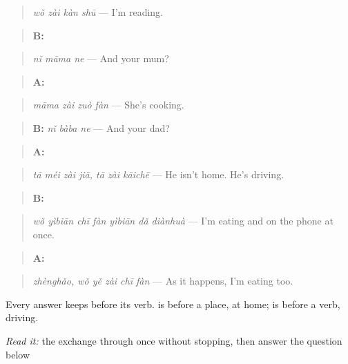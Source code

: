 \begin{quote}
\emph{wǒ zài kàn shū} — I'm reading.
\end{quote}

\begin{quote}
\textbf{B:} 
\end{quote}

\begin{quote}
\emph{nǐ māma ne} — And your mum?
\end{quote}

\begin{quote}
\textbf{A:} 
\end{quote}

\begin{quote}
\emph{māma zài zuò fàn} — She's cooking.
\end{quote}

\begin{quote}
\textbf{B:} \emph{nǐ bàba ne} — And your dad?
\end{quote}

\begin{quote}
\textbf{A:}  
\end{quote}

\begin{quote}
\emph{tā méi zài jiā, tā zài kāichē} — He isn't home. He's driving.
\end{quote}

\begin{quote}
\textbf{B:} 
\end{quote}

\begin{quote}
\emph{wǒ yìbiān chī fàn yìbiān dǎ diànhuà} — I'm eating and on the phone at once.
\end{quote}

\begin{quote}
\textbf{A:}  
\end{quote}

\begin{quote}
\emph{zhènghǎo, wǒ yě zài chī fàn} — As it happens, I'm eating too.
\end{quote}

Every answer keeps  before its verb.  is  before a place, at home;  is  before a verb, driving.

\begin{tcolorbox}[breakable,skin=enhanced,colback=orange!6,colframe=orange!45!black,boxrule=0.5pt,arc=1mm,left=6pt,right=6pt,top=4pt,bottom=4pt,fonttitle=\bfseries,title={Read this}]
\emph{Read it:} the exchange through once without stopping, then answer the question below
\end{tcolorbox}

